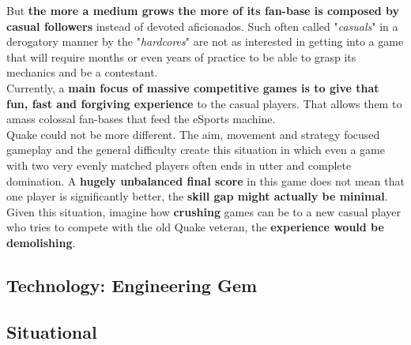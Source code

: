 But \textbf{the more a medium grows the more of its fan-base is composed by casual followers} instead of devoted aficionados. Such often called "\textit{casuals}" in a derogatory manner by the "\textit{hardcores}" are not as interested in getting into a game that will require months or even years of practice to be able to grasp its mechanics and be a contestant.\\

Currently, a \textbf{main focus of massive competitive games is to give that fun, fast and forgiving experience} to the casual players. That allows them to amass colossal fan-bases that feed the eSports machine.\\

Quake could not be more different. The aim, movement and strategy focused gameplay and the general difficulty create this situation in which even a game with two very evenly matched players often ends in utter and complete domination. A \textbf{hugely unbalanced final score} in this game does not mean that one player is significantly better, the \textbf{skill gap might actually be minimal}. Given this situation, imagine how \textbf{crushing} games can be to a new casual player who tries to compete with the old Quake veteran, the \textbf{experience would be demolishing}.\\




\subsection{Technology: Engineering Gem }

\subsection{Situational}


































